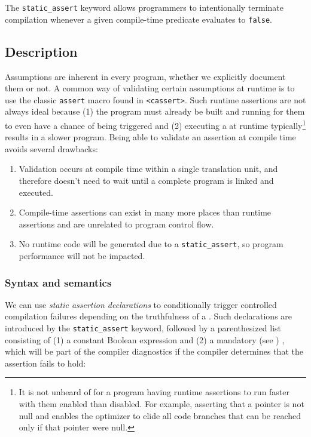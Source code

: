 


The \lstinline!static_assert! keyword allows programmers to intentionally terminate compilation whenever a given compile-time predicate
 evaluates to \lstinline!false!.

\subsection[Description]{Description}\label{description}

Assumptions are
inherent in every program, whether we explicitly document them or not. A common way of validating certain
assumptions at runtime is to use the classic \lstinline!assert! macro found
in \lstinline!<cassert>!. Such runtime assertions are not always ideal
because (1) the program must already be built and running for them to
even have a chance of being triggered and (2) executing a
 at runtime typically{\cprotect\footnote{It is
not unheard of for a program having runtime assertions to run faster with them
enabled than disabled. For example, asserting that a pointer is not
null and enables the optimizer to elide all code branches that
  can be reached only if that pointer were null.}} results in a slower
program. Being able to validate an assertion at compile time avoids
several drawbacks:

\begin{enumerate}
\item{Validation occurs at compile time within a single translation unit, and therefore doesn’t need to wait until a complete program is linked and executed.}
\item{Compile-time assertions can exist in many more places than runtime assertions and are unrelated to program control flow.}
\item{No runtime code will be generated due to a \lstinline!static_assert!, so program performance will not be impacted.}
\end{enumerate}

\subsubsection[Syntax and semantics]{Syntax and semantics}\label{syntax-and-semantics}

We can use \emph{static assertion declarations} to conditionally trigger
controlled compilation failures depending on the truthfulness of a
. Such declarations are introduced by the
\lstinline!static_assert! keyword, followed by a parenthesized list
consisting of (1) a constant Boolean expression and (2) a mandatory (see 
) 
, which will be
part of the compiler diagnostics if the compiler determines that the
assertion fails to hold:

